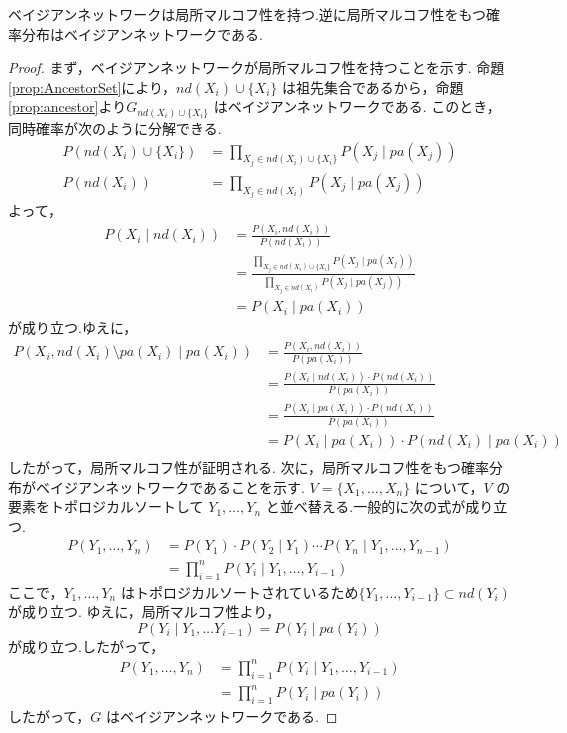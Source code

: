 \documentclass[uplatex, dvipdfmx]{jsarticle}
\begin{document}
\begin{prop}{}
  ベイジアンネットワークは局所マルコフ性を持つ.逆に局所マルコフ性をもつ確率分布はベイジアンネットワークである.
\end{prop}

\begin{proof}
  まず，ベイジアンネットワークが局所マルコフ性を持つことを示す.
  命題\ref{prop:AncestorSet}により，$nd(X_i) \cup \{X_i\}$ は祖先集合であるから，命題\ref{prop:ancestor}より$G_{nd(X_i) \cup \{X_i\}}$ はベイジアンネットワークである.
  このとき，同時確率が次のように分解できる.
  \begin{align}
      P(nd(X_i) \cup \{X_i\}) &= \prod_{X_j \in nd(X_i) \cup \{X_i\}} P(X_j \mid pa(X_j)) \\
      P(nd(X_i)) &= \prod_{X_j \in nd(X_i)} P(X_j \mid pa(X_j))
  \end{align}
  よって，
  \begin{align}
      P(X_i \mid nd(X_i)) &= \frac{P(X_i,nd(X_i))}{P(nd(X_i))} \\
      &= \frac{\prod_{X_j \in nd(X_i) \cup \{X_i\}} P(X_j \mid pa(X_j))}{\prod_{X_j \in nd(X_i)} P(X_j \mid pa(X_j))} \\
      &= P(X_i \mid pa(X_i))
  \end{align}
  が成り立つ.ゆえに，
  \begin{align}
      P(X_i, nd(X_i) \setminus pa(X_i) \mid pa(X_i)) &= \frac{P(X_i, nd(X_i))}{P(pa(X_i))} \\
      &= \frac{P(X_i \mid nd(X_i)) \cdot P(nd(X_i))}{P(pa(X_i))} \\
      &= \frac{P(X_i \mid pa(X_i)) \cdot P(nd(X_i))}{P(pa(X_i))} \\
      &= P(X_i \mid pa(X_i)) \cdot P(nd(X_i) \mid pa(X_i)) \\
  \end{align}
  したがって，局所マルコフ性が証明される.
  次に，局所マルコフ性をもつ確率分布がベイジアンネットワークであることを示す.
  $V = \{X_1, \dots, X_n\}$ について，$V$ の要素をトポロジカルソートして $Y_1, \dots, Y_n$ と並べ替える.一般的に次の式が成り立つ.
  \begin{align}
      P(Y_1, \dots, Y_n) &= P(Y_1) \cdot P(Y_2 \mid Y_1) \cdots P(Y_n \mid Y_1, \dots, Y_{n-1}) \\
      &= \prod_{i=1}^{n} P(Y_i \mid Y_1, \dots, Y_{i-1})
  \end{align}
  ここで，$Y_1, \dots, Y_n$ はトポロジカルソートされているため$\{Y_1, \dots, Y_{i-1}\} \subset nd(Y_i)$ が成り立つ.
  ゆえに，局所マルコフ性より，
  \begin{equation}
      P(Y_i \mid Y_1, \dots Y_{i-1}) = P(Y_i \mid pa(Y_i))
  \end{equation}
  が成り立つ.したがって，
  \begin{align}
    P(Y_1, \dots, Y_n) &= \prod_{i=1}^{n} P(Y_i \mid Y_1, \dots, Y_{i-1}) \\
     &= \prod_{i=1}^{n} P(Y_i \mid pa(Y_i))
  \end{align}  
  したがって，$G$ はベイジアンネットワークである.
\end{proof}
\end{document}
